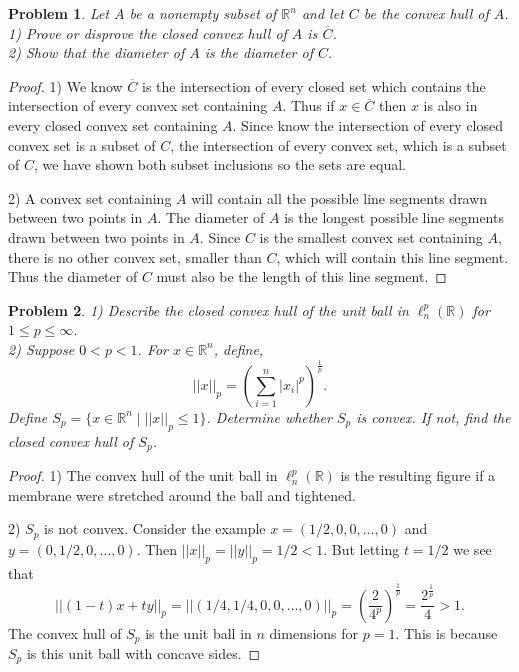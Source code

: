 \documentclass{article}
\newtheorem{problem}{Problem}
\begin{document}
\begin{flushleft}
\begin{problem}
Let $A$ be a nonempty subset of $\mathbb{R}^n$ and let $C$ be the convex hull of $A$.\\
1) Prove or disprove the closed convex hull of $A$ is $\overline{C}$.\\
2) Show that the diameter of $A$ is the diameter of $C$.
\end{problem}
\begin{proof}
1) We know $\overline{C}$ is the intersection of every closed set which contains the intersection of every convex set containing $A$. Thus if $x \in \overline{C}$ then $x$ is also in every closed convex set containing $A$. Since know the intersection of every closed convex set is a subset of $C$, the intersection of every convex set, which is a subset of $C$, we have shown both subset inclusions so the sets are equal.\newline

2) A convex set containing $A$ will contain all the possible line segments drawn between two points in $A$. The diameter of $A$ is the longest possible line segments drawn between two points in $A$. Since $C$ is the smallest convex set containing $A$, there is no other convex set, smaller than $C$, which will contain this line segment. Thus the diameter of $C$ must also be the length of this line segment.
\end{proof}

\begin{problem}
1) Describe the closed convex hull of the unit ball in $\ell_n^p (\mathbb{R})$ for $1 \leq p \leq \infty$.\\
2) Suppose $0 < p < 1$. For $x \in \mathbb{R}^n$, define,
\[
||x||_p = \left ( \sum_{i=1}^{n} |x_i|^p \right )^{\frac{1}{p}}.
\]
Define $S_p = \{x \in \mathbb{R}^n \mid ||x||_p \leq 1\}$. Determine whether $S_p$ is convex. If not, find the closed convex hull of $S_p$.
\end{problem}
\begin{proof}
1) The convex hull of the unit ball in $\ell_n^p (\mathbb{R})$ is the resulting figure if a membrane were stretched around the ball and tightened.\newline

2) $S_p$ is not convex. Consider the example $x = (1/2, 0, 0, \dots , 0)$ and $y = (0, 1/2, 0, \dots , 0)$. Then $||x||_p = ||y||_p = 1/2 < 1$. But letting $t=1/2$ we see that
\[
||(1-t)x + ty||_p = ||(1/4, 1/4, 0, 0, \dots , 0)||_p = \left ( \frac{2}{4^p} \right )^{\frac{1}{p}} = \frac{2^{\frac{1}{p}}}{4} > 1.
\]
The convex hull of $S_p$ is the unit ball in $n$ dimensions for $p=1$. This is because $S_p$ is this unit ball with concave sides.
\end{proof}

\end{flushleft}
\end{document}
